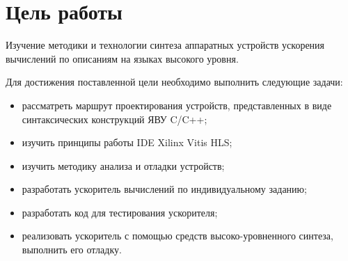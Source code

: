 \setcounter{page}{2}
\chapter*{Цель работы}
Изучение методики и технологии синтеза аппаратных устройств ускорения вычислений по описаниям на языках высокого уровня. 

Для достижения поставленной цели необходимо выполнить следующие задачи:
\begin{itemize}
	\item рассматреть маршрут проектирования устройств, представленных в виде синтаксических конструкций ЯВУ C/C++;
	\item изучить принципы работы IDE Xilinx Vitis HLS;
	\item изучить методику анализа и отладки устройств;
	\item разработать ускоритель вычислений по индивидуальному заданию;
	\item разработать код для тестирования ускорителя;
	\item реализовать ускоритель с помощью средств высоко-уровненного синтеза, выполнить его отладку.
\end{itemize}